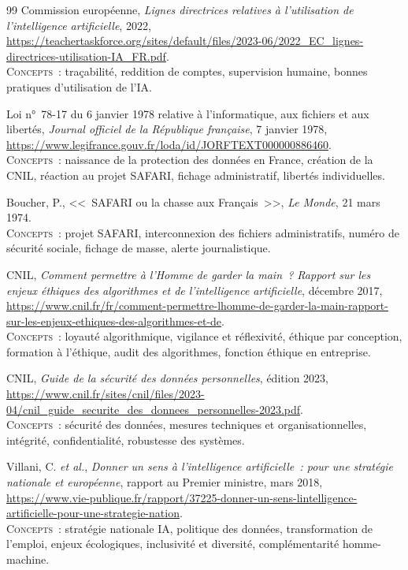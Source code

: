 \documentclass[12pt,a4paper]{article}
\begin{document}
\begin{thebibliography}{99}
Commission européenne, \textit{Lignes directrices relatives à l'utilisation de l'intelligence artificielle}, 2022,
\url{https://teachertaskforce.org/sites/default/files/2023-06/2022_EC_lignes-directrices-utilisation-IA_FR.pdf}.
\\[2pt] {\small \textsc{Concepts~:} traçabilité, reddition de comptes, supervision humaine, bonnes pratiques d'utilisation de l'IA.}


Loi n°~78-17 du 6 janvier 1978 relative à l'informatique, aux fichiers et aux libertés, \textit{Journal officiel de la République française}, 7 janvier 1978,
\url{https://www.legifrance.gouv.fr/loda/id/JORFTEXT000000886460}.
\\[2pt] {\small \textsc{Concepts~:} naissance de la protection des données en France, création de la CNIL, réaction au projet SAFARI, fichage administratif, libertés individuelles.}

Boucher, P., <<~SAFARI ou la chasse aux Français~>>, \textit{Le Monde}, 21 mars 1974.
\\[2pt] {\small \textsc{Concepts~:} projet SAFARI, interconnexion des fichiers administratifs, numéro de sécurité sociale, fichage de masse, alerte journalistique.}

CNIL, \textit{Comment permettre à l'Homme de garder la main~? Rapport sur les enjeux éthiques des algorithmes et de l'intelligence artificielle}, décembre 2017,
\url{https://www.cnil.fr/fr/comment-permettre-lhomme-de-garder-la-main-rapport-sur-les-enjeux-ethiques-des-algorithmes-et-de}.
\\[2pt] {\small \textsc{Concepts~:} loyauté algorithmique, vigilance et réflexivité, éthique par conception, formation à l'éthique, audit des algorithmes, fonction éthique en entreprise.}

CNIL, \textit{Guide de la sécurité des données personnelles}, édition 2023,
\url{https://www.cnil.fr/sites/cnil/files/2023-04/cnil_guide_securite_des_donnees_personnelles-2023.pdf}.
\\[2pt] {\small \textsc{Concepts~:} sécurité des données, mesures techniques et organisationnelles, intégrité, confidentialité, robustesse des systèmes.}

Villani, C. \textit{et al.}, \textit{Donner un sens à l'intelligence artificielle~: pour une stratégie nationale et européenne}, rapport au Premier ministre, mars 2018,
\url{https://www.vie-publique.fr/rapport/37225-donner-un-sens-lintelligence-artificielle-pour-une-strategie-nation}.
\\[2pt] {\small \textsc{Concepts~:} stratégie nationale IA, politique des données, transformation de l'emploi, enjeux écologiques, inclusivité et diversité, complémentarité homme-machine.}


\end{thebibliography}
\end{document}
